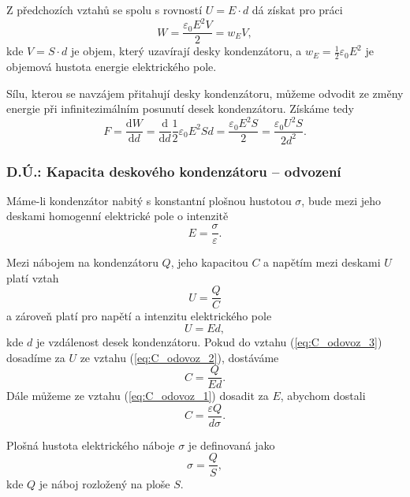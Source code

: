 \documentclass[english]{article}
\newcommand{\dd}{\mathrm{d}}
\begin{document}
		Z předchozích vztahů se spolu s rovností $U = E\cdot d$ dá získat pro práci
		\begin{equation}
		W = \frac{\varepsilon_0 E^2 V}{2} = w_E V,
		\end{equation}
		kde $V = S\cdot d$ je objem, který uzavírají desky kondenzátoru, a $w_E = \frac{1}{2} \varepsilon_0 E^2$ je objemová hustota energie elektrického pole.
		
		Sílu, kterou se navzájem přitahují desky kondenzátoru, můžeme odvodit ze změny energie při infinitezimálním posunutí desek kondenzátoru. Získáme tedy
		\begin{equation}\label{eq:SilaMeziDeskamiKondenzátoru}
		F = \frac{\dd W}{\dd d} = \frac{\dd }{\dd d} \frac{1}{2} \varepsilon_0 E^2 S d = \frac{\varepsilon_0 E^2 S}{2} = \frac{\varepsilon_0 U^2 S}{2 d^2}.
		\end{equation}
		
		\subsubsection{D.Ú.: Kapacita deskového kondenzátoru -- odvození}
		Máme-li kondenzátor nabitý s konstantní plošnou hustotou $\sigma$, bude mezi jeho deskami homogenní elektrické pole o intenzitě
		\begin{equation} \label{eq:C_odovoz_1}
		E = \frac{\sigma}{\varepsilon}.
		\end{equation}
		
		Mezi nábojem na kondenzátoru $Q$, jeho kapacitou $C$ a napětím mezi deskami $U$ platí vztah
		\begin{equation} \label{eq:C_odovoz_2}
		U = \frac{Q}{C}
		\end{equation}
		a zároveň platí pro napětí a intenzitu elektrického pole 
		\begin{equation} \label{eq:C_odovoz_3}
		U = Ed,
		\end{equation}
		kde $d$ je vzdálenost desek kondenzátoru. Pokud do vztahu (\ref{eq:C_odovoz_3}) dosadíme za $U$ ze vztahu (\ref{eq:C_odovoz_2}), dostáváme
		\begin{equation} \label{eq:C_odovoz_4}
		C = \frac{Q}{Ed}.
		\end{equation}
		Dále můžeme ze vztahu (\ref{eq:C_odovoz_1}) dosadit za $E$, abychom dostali 
		\begin{equation} \label{eq:C_odovoz_5}
		C = \frac{\varepsilon Q}{d \sigma}.
		\end{equation}
		
		Plošná hustota elektrického náboje $\sigma$ je definovaná jako 
		\begin{equation} \label{eq:C_odovoz_6}
		\sigma = \frac{Q}{S},
		\end{equation}
		kde $Q$ je náboj rozložený na ploše $S$.
		
\end{document}
